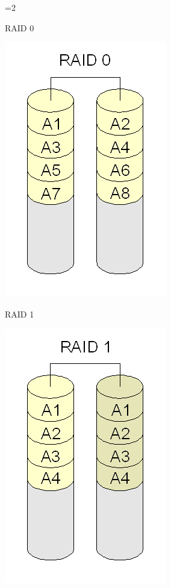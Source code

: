 =2


\begin{frame}{RAID 0}
  
  \includegraphics[scale=.3]{raid0.png}

\end{frame}


\begin{frame}{RAID 1}
  
  \includegraphics[scale=.3]{raid1.png}

\end{frame}


